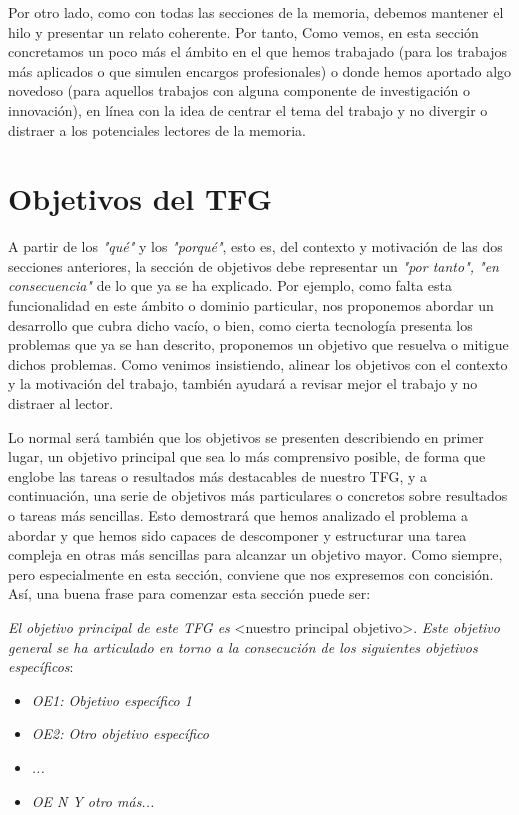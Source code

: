 Por otro lado, como con todas las secciones de la memoria, debemos mantener el hilo y presentar un relato coherente. Por tanto, Como vemos, en esta sección concretamos un poco más el ámbito en el que hemos trabajado (para los trabajos más aplicados o que simulen encargos profesionales) o donde hemos aportado algo novedoso (para aquellos trabajos con alguna componente de investigación o innovación), en línea con la idea de centrar el tema del trabajo y no divergir o distraer a los potenciales lectores de la memoria.

\section{Objetivos del TFG}
A partir de los \textit{"qué"} y los \textit{"porqué"}, esto es, del contexto y motivación de las dos secciones anteriores, la sección de objetivos debe representar un \textit{"por tanto", "en consecuencia"} de lo que ya se ha explicado. Por ejemplo, como falta esta funcionalidad en este ámbito o dominio particular, nos proponemos abordar un desarrollo que cubra dicho vacío, o bien, como cierta tecnología presenta los problemas que ya se han descrito, proponemos un objetivo que resuelva o mitigue dichos problemas. Como venimos insistiendo, alinear los objetivos con el contexto y la motivación del trabajo, también ayudará a revisar mejor el trabajo y no distraer al lector.

Lo normal será también que los objetivos se presenten describiendo en primer lugar, un objetivo principal que sea lo más comprensivo posible, de forma que englobe las tareas o resultados más destacables de nuestro TFG, y a continuación, una serie de objetivos más particulares o concretos sobre resultados o tareas más sencillas. Esto demostrará que hemos analizado el problema a abordar y que hemos sido capaces de descomponer y estructurar una tarea compleja en otras más sencillas para alcanzar un objetivo mayor. Como siempre, pero especialmente en esta sección, conviene que nos expresemos con concisión. Así, una buena frase para comenzar esta sección puede ser:

\textit{El objetivo principal de este TFG es } \textless nuestro principal objetivo\textgreater. \textit{Este objetivo general se ha articulado en torno a la consecución de los siguientes objetivos específicos}:
\begin{itemize}
  \item \textit{OE1: Objetivo específico 1}
  \item \textit{OE2: Otro objetivo específico}
  \item \textit{...}
  \item \textit{OE N Y otro más...}
\end{itemize}

